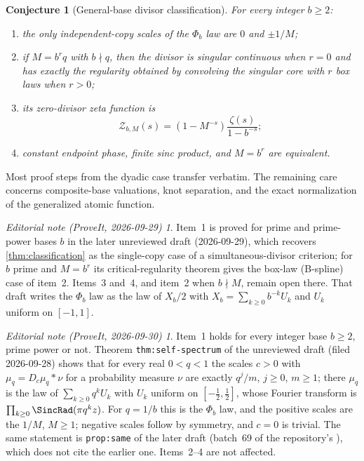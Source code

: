 \documentclass[11pt,oneside]{article}
\newtheorem{conjecture}[theorem]{Conjecture}
\theoremstyle{definition}
\theoremstyle{remark}
\newtheorem*{ednote}{Editorial note (ProveIt, 2026-09-29)}
\newtheorem*{ednotelater}{Editorial note (ProveIt, 2026-09-30)}
\begin{document}
\begin{conjecture}[General-base divisor classification]
\label{conj:general-base}
For every integer $b\ge2$:
\begin{enumerate}
\item the only independent-copy scales of the $\Phi_b$ law are $0$ and $\pm1/M$;
\item if $M=b^rq$ with $b\nmid q$, then the divisor is singular continuous when $r=0$
and has exactly the regularity obtained by convolving the singular core with $r$ box laws
when $r>0$;
\item its zero-divisor zeta function is
\begin{equation}
 \mathcal Z_{b,M}(s)=(1-M^{-s})\frac{\zeta(s)}{1-b^{-s}};
 \label{eq:general-base-zeta}
\end{equation}
\item constant endpoint phase, finite sinc product, and $M=b^r$ are equivalent.
\end{enumerate}
\end{conjecture}

Most proof steps from the dyadic case transfer verbatim.  The remaining care concerns
composite-base valuations, knot separation, and the exact normalization of the generalized
atomic function.

\begin{ednote}
Item~1 is proved for prime and prime-power bases $b$ in the later unreviewed
draft 
(2026-09-29), which recovers \cref{thm:classification} as the single-copy
case of a simultaneous-divisor criterion; for $b$ prime and $M=b^r$ its
critical-regularity theorem gives the box-law (B-spline) case of item~2.
Items~3 and~4, and item~2 when $b\nmid M$, remain open there. That draft
writes the $\Phi_b$ law as the law of $X_b/2$ with
$X_b=\sum_{k\ge0}b^{-k}U_k$ and $U_k$ uniform on $[-1,1]$.
\end{ednote}
\begin{ednotelater}
Item~1 holds for every integer base $b\ge2$, prime power or not. Theorem
\texttt{thm:self-spectrum} of the unreviewed draft
(filed 2026-09-28) shows that for every real $0<q<1$ the scales $c>0$ with
$\mu_q=D_c\mu_q*\nu$ for a probability measure $\nu$ are exactly $q^j/m$,
$j\ge0$, $m\ge1$; there $\mu_q$ is the law of $\sum_{k\ge0}q^kU_k$ with
$U_k$ uniform on $[-\tfrac12,\tfrac12]$, whose Fourier transform is
$\prod_{k\ge0}\SincRad(\pi q^kz)$. For $q=1/b$ this is the $\Phi_b$ law,
and the positive scales are the $1/M$, $M\ge1$; negative scales follow by
symmetry, and $c=0$ is trivial. The same statement is \texttt{prop:same} of
the later draft
(batch~69 of the repository's ), which does not cite
the earlier one. Items~2--4 are not affected.
\end{ednotelater}
\end{document}
